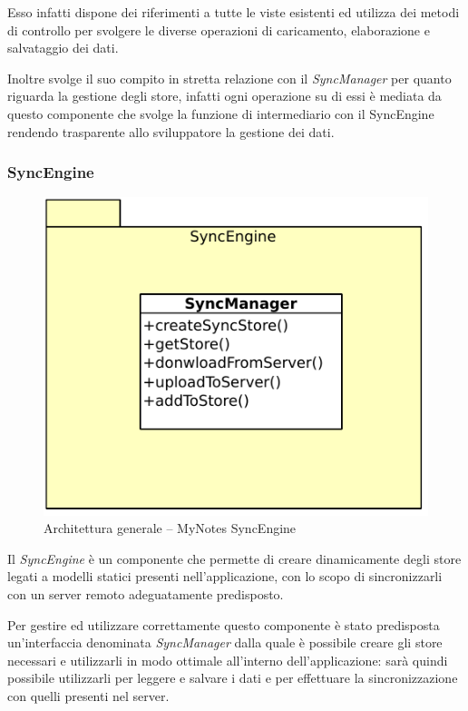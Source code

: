 Esso infatti dispone dei riferimenti a tutte le viste esistenti ed utilizza dei metodi di controllo per svolgere le diverse operazioni di caricamento, elaborazione e salvataggio dei dati.

Inoltre svolge il suo compito in stretta relazione con il \emph{SyncManager} per quanto riguarda la gestione degli store, infatti ogni operazione su di essi è mediata da questo componente che svolge la funzione di intermediario con il SyncEngine rendendo trasparente allo sviluppatore la gestione dei dati.

\subsubsection{SyncEngine}
\begin{figure}[htb]
\centering
\includegraphics[scale=0.6]{gfx/class/SyncEngine.pdf}
\caption{Architettura generale -- MyNotes SyncEngine}
\label{fig:architettura MyNotes SyncEngine}
\end{figure}

Il \emph{SyncEngine} è un componente che permette di creare dinamicamente degli store legati a modelli statici presenti nell'applicazione, con lo scopo di sincronizzarli con un server remoto adeguatamente predisposto.

Per gestire ed utilizzare correttamente questo componente è stato predisposta un'interfaccia denominata \emph{SyncManager} dalla quale è possibile creare gli store necessari e utilizzarli in modo ottimale all'interno dell'applicazione: sarà quindi possibile utilizzarli per leggere e salvare i dati e per effettuare la sincronizzazione con quelli presenti nel server.

